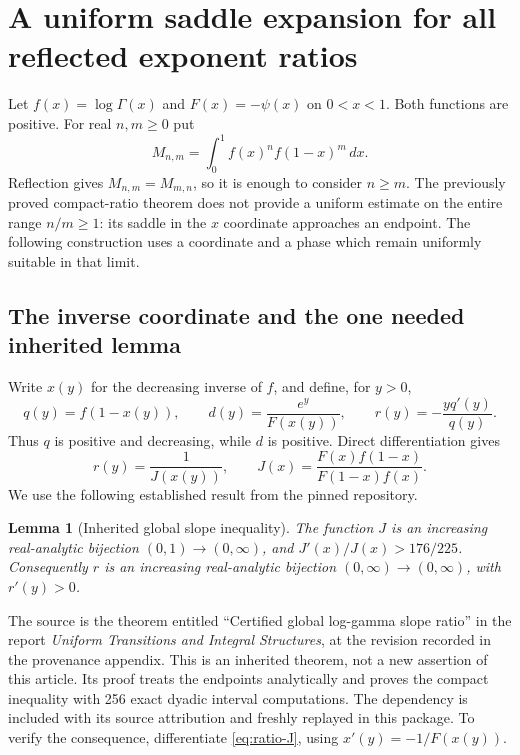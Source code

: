 \documentclass[11pt,letterpaper]{article}
\newtheorem{lemma}[theorem]{Lemma}
\theoremstyle{definition}
\theoremstyle{remark}
\begin{document}
\section{A uniform saddle expansion for all reflected exponent ratios}
\label{sec:all-ratios}

Let $f(x)=\log\Gamma(x)$ and $F(x)=-\psi(x)$ on $0<x<1$.
Both functions are positive. For real $n,m\ge0$ put
\[
 M_{n,m}=\int_0^1 f(x)^n f(1-x)^m\,dx.
\]
Reflection gives $M_{n,m}=M_{m,n}$, so it is enough to consider
$n\ge m$. The previously proved compact-ratio theorem does not provide a uniform
estimate on the entire range $n/m\ge1$: its saddle in the $x$ coordinate
approaches an endpoint. The following construction uses a coordinate
and a phase which remain uniformly suitable in that limit.

\subsection{The inverse coordinate and the one needed inherited lemma}

Write $x(y)$ for the decreasing inverse of $f$, and define, for $y>0$,
\begin{equation}\label{eq:ratio-definitions}
 q(y)=f(1-x(y)),\qquad
 d(y)=\frac{e^y}{F(x(y))},\qquad
 r(y)=-\frac{yq'(y)}{q(y)}.
\end{equation}
Thus $q$ is positive and decreasing, while $d$ is positive. Direct
differentiation gives
\begin{equation}\label{eq:ratio-J}
 r(y)=\frac{1}{J(x(y))},\qquad
 J(x)=\frac{F(x)f(1-x)}{F(1-x)f(x)}.
\end{equation}
We use the following established result from the pinned repository.

\begin{lemma}[Inherited global slope inequality]\label{lem:inherited-J}
The function $J$ is an increasing real-analytic bijection
$(0,1)\longrightarrow(0,\infty)$, and
$J'(x)/J(x)>176/225$. Consequently $r$ is an increasing
real-analytic bijection $(0,\infty)\longrightarrow(0,\infty)$,
with $r'(y)>0$.
\end{lemma}

The source is the theorem entitled ``Certified global log-gamma slope
ratio'' in the report \emph{Uniform Transitions and Integral Structures},
at the revision recorded in the provenance appendix. This is an inherited
theorem, not a new assertion of this article. Its proof treats the
endpoints analytically and proves the compact inequality with 256 exact
dyadic interval computations. The dependency is included with its source
attribution and freshly replayed in this package. To verify the consequence,
differentiate \eqref{eq:ratio-J}, using $x'(y)=-1/F(x(y))$.
\end{document}
